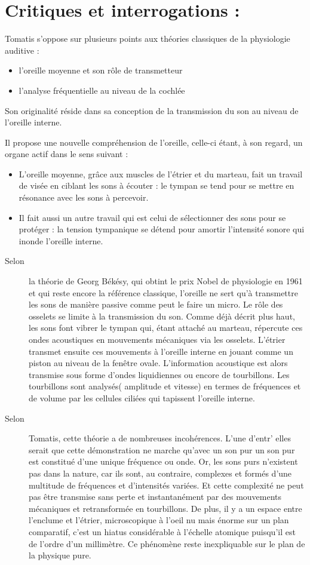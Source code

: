 \documentclass[12pt,french]{report}
\makeatletter
\let\SF@@footnote\footnote
\def\footnote{\ifx\protect\@typeset@protect
    \expandafter\SF@@footnote
  \else
    \expandafter\SF@gobble@opt
  \fi
}
\edef\SF@gobble@opt{\noexpand\protect
  \expandafter\noexpand\csname SF@gobble@opt \endcsname}
\makeatother
\begin{document}
\section{Critiques et interrogations :}

Tomatis s'oppose sur plusieurs points aux théories classiques de la
physiologie auditive : 
\begin{itemize}
\item l'oreille moyenne et son rôle de transmetteur 
\item l'analyse fréquentielle au niveau de la cochlée
\end{itemize}
Son originalité réside dans sa conception de la transmission du son
au niveau de l'oreille interne. 

Il propose une nouvelle compréhension de l'oreille, celle-ci étant,
à son regard, un organe actif dans le sens suivant :
\begin{itemize}
\item L'oreille moyenne, grâce aux muscles de l'étrier et du marteau, fait
un travail de visée en ciblant les sons à écouter : le tympan se tend
pour se mettre en résonance avec les sons à percevoir.
\item Il fait aussi un autre travail qui est celui de sélectionner des sons
pour se protéger : la tension tympanique se détend pour amortir l'intensité
sonore qui inonde l'oreille interne. 
\end{itemize}
\begin{description}
\item [{Selon}] la théorie de Georg Békésy, qui obtint le prix Nobel de
physiologie en 1961 et qui reste encore la référence classique, l'oreille
ne sert qu'à transmettre les sons de manière passive comme peut le
faire un micro. Le rôle des osselets se limite à la transmission du
son. Comme déjà décrit plus haut, les sons font vibrer le tympan qui,
étant attaché au marteau, répercute ces ondes acoustiques en mouvements
mécaniques via les osselets. L'étrier transmet ensuite ces mouvements
à l'oreille interne en jouant comme un piston au niveau de la fenêtre
ovale. L'information acoustique est alors transmise sous forme d'ondes
liquidiennes ou encore de tourbillons. Les tourbillons sont analysés(
amplitude et vitesse) en termes de fréquences et de volume par les
cellules ciliées qui tapissent l'oreille interne. 
\item [{Selon}] Tomatis, cette théorie a de nombreuses incohérences. L'une
d'entr' elles serait que cette démonstration ne marche qu'avec un
son pur \footnote{un son pur est constitué d'une unique fréquence ou onde}.
Or, les sons purs n'existent pas dans la nature, car ils sont, au
contraire, complexes et formés d'une multitude de fréquences et d'intensités
variées. Et cette complexité ne peut pas être transmise sans perte
et instantanément par des mouvements mécaniques et retransformée en
tourbillons. De plus, il y a un espace entre l'enclume et l'étrier,
microscopique à l'oeil nu mais énorme sur un plan comparatif, c'est
un hiatus considérable à l'échelle atomique puisqu'il est de l'ordre
d'un millimètre. Ce phénomène reste inexpliquable sur le plan de la
physique pure.
\end{description}
\end{document}
